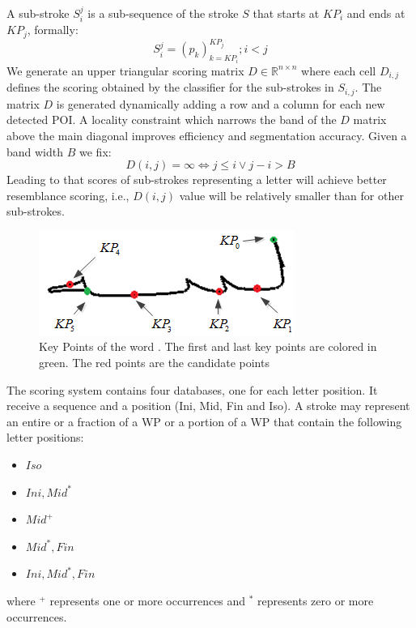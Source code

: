 \documentclass[journal,compsoc]{IEEEtran}
\begin{document}
A sub-stroke $S_{i}^{j}$ is a sub-sequence of the stroke $S$ that starts at $KP_{i}$ and ends at $KP_{j}$, formally:
\begin{equation}
S_{i}^{j}=(p_{k})_{k=KP_{i}}^{KP_{j}}; i<j
\end{equation}
We generate an upper triangular scoring matrix $D\in\mathbb{R}^{n\times n}$ where each cell $D_{i,j}$ defines the scoring obtained by the classifier for the sub-strokes in $S_{i,j}$. The matrix $D$ is generated dynamically adding a row and a column for each new detected POI. A locality constraint which narrows the band of the $D$ matrix above the main diagonal improves efficiency and segmentation accuracy. Given a band width $B$ we fix:
\begin{equation}
D(i,j)=\infty \Leftrightarrow j \leq i \vee j-i>B 
\end{equation}
Leading to that scores of sub-strokes representing a letter will achieve better resemblance scoring, i.e., $D(i,j)$ value will be relatively smaller than for other sub-strokes.\\

\begin{figure}
\centering
\includegraphics[width=0.7\columnwidth]{./figures/candidate_points}
\caption{Key Points of the word . The first and last key points are colored in green. The red points are the candidate points}
\label{fig:candidate_points}
\end{figure}

The scoring system contains four databases, one for each letter position. It receive a sequence and a position (Ini, Mid, Fin and Iso). A stroke may represent an entire or a fraction of a WP or a portion of a WP that contain the following letter positions: 
\begin{multicols}{2}
\begin{itemize}
    \item $Iso$
    \item $Ini,Mid^{*}$
    \item $Mid^{+}$    
    \item $Mid^{*},Fin$
    \item $Ini,Mid^{*},Fin$
\end{itemize}
\end{multicols}
where $^{+}$ represents one or more occurrences and $^{*}$ represents zero or more occurrences.\\
\end{document}

